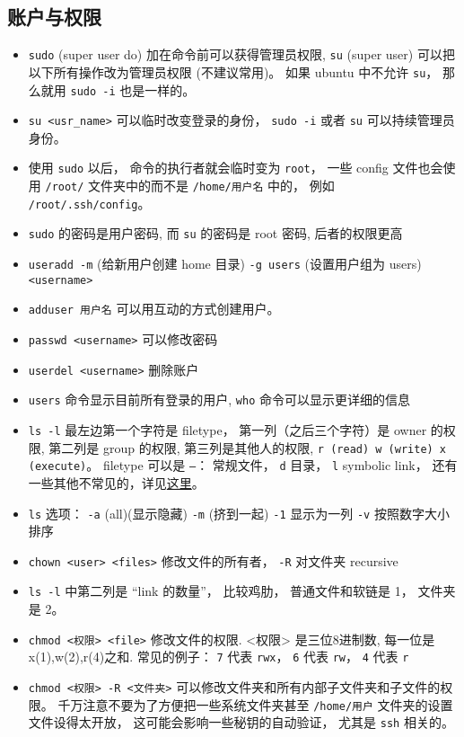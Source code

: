 \subsection{账户与权限}
\begin{itemize}
\item \verb`sudo` (super user do) 加在命令前可以获得管理员权限, \verb`su` (super user) 可以把以下所有操作改为管理员权限 (不建议常用)。 如果 ubuntu 中不允许 \verb|su|， 那么就用 \verb|sudo -i| 也是一样的。
\item \verb`su <usr_name>` 可以临时改变登录的身份， \verb|sudo -i| 或者 \verb|su| 可以持续管理员身份。
\item 使用 \verb|sudo| 以后， 命令的执行者就会临时变为 \verb|root|， 一些 config 文件也会使用 \verb|/root/| 文件夹中的而不是 \verb|/home/用户名| 中的， 例如 \verb|/root/.ssh/config|。
\item \verb`sudo` 的密码是用户密码, 而 \verb`su` 的密码是 root 密码, 后者的权限更高
\item \verb`useradd -m` (给新用户创建 home 目录) \verb`-g users` (设置用户组为 users) \verb`<username>`
\item \verb|adduser 用户名| 可以用互动的方式创建用户。
\item \verb`passwd <username>` 可以修改密码
\item \verb`userdel <username>` 删除账户
\item \verb`users` 命令显示目前所有登录的用户, \verb`who` 命令可以显示更详细的信息
\item \verb`ls -l` 最左边第一个字符是 filetype， 第一列（之后三个字符）是 owner 的权限, 第二列是 group 的权限, 第三列是其他人的权限, \verb`r (read) w (write) x (execute)`。 filetype 可以是 \verb|–|： 常规文件， \verb|d| 目录， \verb|l| symbolic link， 还有一些其他不常见的，详见\href{https://linuxconfig.org/identifying-file-types-in-linux}{这里}。
\item \verb`ls` 选项： \verb`-a` (all)(显示隐藏) \verb`-m` (挤到一起) \verb`-1` 显示为一列 \verb`-v` 按照数字大小排序
\item \verb`chown <user> <files>` 修改文件的所有者， \verb|-R| 对文件夹 recursive
\item \verb|ls -l| 中第二列是 “link 的数量”， 比较鸡肋， 普通文件和软链是 1， 文件夹是 2。
\item \verb`chmod <权限> <file>` 修改文件的权限. <权限> 是三位8进制数, 每一位是 x(1),w(2),r(4)之和. 常见的例子： \verb|7| 代表 \verb|rwx|， \verb|6| 代表 \verb|rw|， \verb|4| 代表 \verb|r|
\item \verb`chmod <权限> -R <文件夹>` 可以修改文件夹和所有内部子文件夹和子文件的权限。 千万注意不要为了方便把一些系统文件夹甚至 \verb|/home/用户| 文件夹的设置文件设得太开放， 这可能会影响一些秘钥的自动验证， 尤其是 \verb|ssh| 相关的。

\end{itemize}
